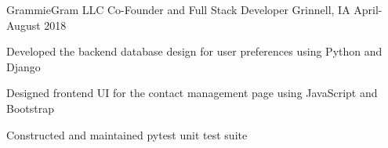 \documentclass[11pt, a4paper]{awesome-cv}
\begin{document}
\begin{cventries}




  \cventry
    {GrammieGram LLC}
    {Co-Founder and Full Stack Developer}
    {Grinnell, IA}
    {April-August 2018}
    {
      \begin{cvitems}
        \item {Developed the backend database design for user preferences using Python and Django}
        \item {Designed frontend UI for the contact management page using JavaScript and Bootstrap}
        \item {Constructed and maintained pytest unit test suite}
      \end{cvitems}
    }

\end{cventries}
\end{document}
